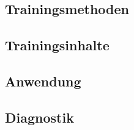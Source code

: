 \subsection{Trainingsmethoden}

\subsection{Trainingsinhalte}

\subsection{Anwendung}

\subsection{Diagnostik}
